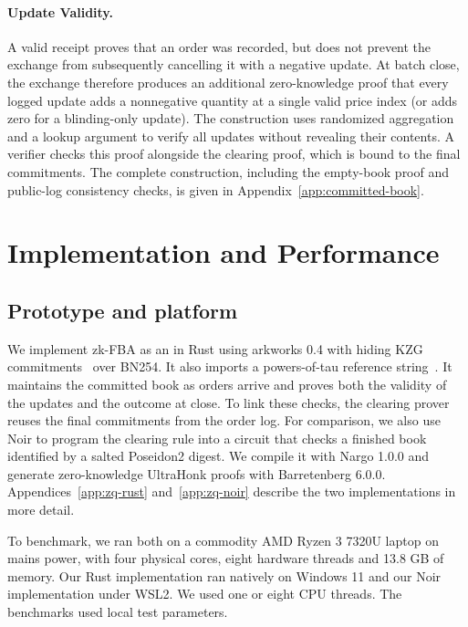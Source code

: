 \paragraph{Update Validity.}
A valid receipt proves that an order was recorded, but does not prevent the exchange from subsequently cancelling it with a negative update. At batch close, the exchange therefore produces an additional zero-knowledge proof that every logged update adds a nonnegative quantity at a single valid price index (or adds zero for a blinding-only update). The construction uses randomized aggregation and a lookup argument to verify all updates without revealing their contents. A verifier checks this proof alongside the clearing proof, which is bound to the final commitments. The complete construction, including the empty-book proof and public-log consistency checks, is given in Appendix~\ref{app:committed-book}.


\section{Implementation and Performance}
\label{sec:zq-performance}

\subsection{Prototype and platform}
\label{sec:zq-platform}

We implement zk-FBA as an \ari in Rust using arkworks 0.4 with hiding KZG commitments~\cite{KZG10} over BN254. It also imports a powers-of-tau reference string~\cite{NRBB24}. It maintains the committed book as orders arrive and proves both the validity of the updates and the outcome at close. To link these checks, the clearing prover reuses the final commitments from the order log. For comparison, we also use Noir to program the clearing rule into a circuit that checks a finished book identified by a salted Poseidon2 digest. We compile it with Nargo 1.0.0 and generate zero-knowledge UltraHonk proofs with Barretenberg 6.0.0. Appendices~\ref{app:zq-rust} and~\ref{app:zq-noir} describe the two implementations in more detail.

To benchmark, we ran both on a commodity AMD Ryzen 3 7320U laptop on mains power, with four physical cores, eight hardware threads and 13.8 GB of memory. Our Rust implementation ran natively on Windows 11 and our Noir implementation under WSL2. We used one or eight CPU threads. The benchmarks used local test parameters.

